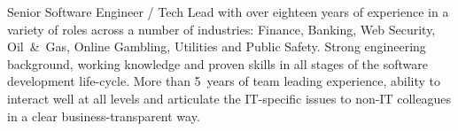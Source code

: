 \documentclass{res}
\newcommand{\osection}[1]{\section{\sc {\Large \textbf{#1}\\}} \vspace{0.30cm}}
\begin{document}
\begin{resume}

\indent Senior Software Engineer / Tech Lead with over eighteen years of experience in a variety of roles across a number of industries: Finance, Banking, Web Security, Oil~\&~Gas, Online Gambling, Utilities and Public Safety. Strong engineering background, working knowledge and proven skills in all stages of the software development life-cycle. More than 5~years of team leading experience, ability to interact well at all levels and articulate the IT-specific issues to non-IT colleagues in a clear business-transparent way.


\end{resume}
\end{document}
